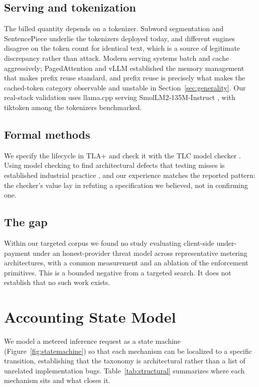 \documentclass[preprint,3p,authoryear,12pt]{elsarticle}
\begin{document}
\subsection{Serving and tokenization}
The billed quantity depends on a tokenizer. Subword segmentation \citep{bpe} and
SentencePiece \citep{sentencepiece} underlie the tokenizers deployed today, and different
engines disagree on the token count for identical text, which is a source of legitimate
discrepancy rather than attack. Modern serving systems batch and cache aggressively;
PagedAttention and vLLM \citep{vllm} established the memory management that makes prefix
reuse standard, and prefix reuse is precisely what makes the cached-token category
observable and unstable in Section~\ref{sec:generality}. Our real-stack validation uses
llama.cpp \citep{llamacpp} serving SmolLM2-135M-Instruct \citep{smollm2}, with tiktoken
\citep{tiktoken} among the tokenizers benchmarked.

\subsection{Formal methods}
We specify the lifecycle in TLA+ \citep{tla} and check it with the TLC model checker
\citep{tlc}. Using
model checking to find architectural defects that testing misses is established
industrial practice \citep{awsformal}, and our experience matches the reported pattern:
the checker's value lay in refuting a specification we believed, not in confirming one.

\subsection{The gap}
Within our targeted corpus we found no study evaluating client-side under-payment under
an honest-provider threat model across representative metering architectures, with a
common measurement and an ablation of the enforcement primitives. This is a bounded
negative from a targeted search. It does not establish that no such work exists.

\section{Accounting State Model}
\label{sec:statemodel}
We model a metered inference request as a state machine (Figure~\ref{fig:statemachine})
so that each mechanism can be localized to a specific transition, establishing that the
taxonomy is architectural rather than a list of unrelated implementation bugs.
Table~\ref{tab:structural} summarizes where each mechanism sits and what closes it.
\end{document}
